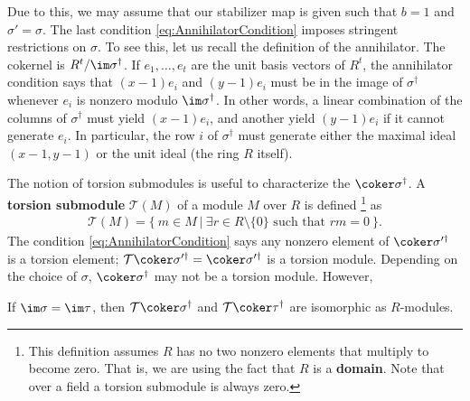 Due to this,
we may assume that our stabilizer map is given such that $b =1$ and $\sigma' = \sigma$.
The last condition \eqref{eq:AnnihilatorCondition} 
imposes stringent restrictions on $\sigma$.
To see this, let us recall the definition of the annihilator.
The cokernel is $R^t / \im \sigma^\dagger$.
If $e_1, \ldots, e_t$ are the unit basis vectors of $R^t$,
the annihilator condition says that $(x-1)e_i$ and $(y-1)e_i$ 
must be in the image of $\sigma^\dagger$ whenever $e_i$ is nonzero modulo $\im \sigma^\dagger$.
In other words, a linear combination of the columns of $\sigma^\dagger$
must yield $(x-1)e_i$, and another yield $(y-1)e_i$ if it cannot generate $e_i$.
In particular, the row $i$ of $\sigma^\dagger$ must generate either
the maximal ideal $(x-1,y-1)$ or the unit ideal (the ring $R$ itself).

The notion of torsion submodules is useful to characterize the $\coker \sigma^\dagger$.
A {\bf torsion submodule} $\mathcal T(M)$ of a module $M$ over $R$
is defined%
\footnote{This definition assumes $R$ has no two nonzero elements
that multiply to become zero. That is, we are using the fact that
$R$ is a {\bf domain}.
Note that over a field a torsion submodule is always zero.
}
as
\begin{align}
\mathcal T(M) = \{~ m \in M ~|~ \exists r \in R \setminus \{0\} \text{ such that } rm = 0 ~\} .
\end{align}
The condition \eqref{eq:AnnihilatorCondition} says
any nonzero element of $\coker \sigma'^\dagger$
is a torsion element; $\mathcal T \coker \sigma'^\dagger = \coker \sigma'^\dagger$
is a torsion module.
Depending on the choice of $\sigma$,
$\coker \sigma^\dagger$ may not be a torsion module.
However,
\begin{prop}
If $\im \sigma = \im \tau$, then 
$\mathcal T \coker \sigma^\dagger$ and $\mathcal T \coker \tau^\dagger$
are isomorphic as $R$-modules.
\label{IsomorphicTorsion}
\end{prop}
